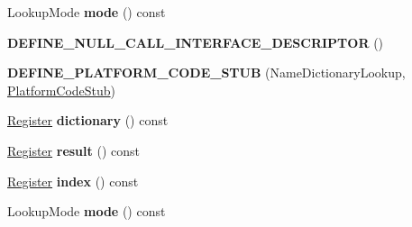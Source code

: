 \begin{DoxyCompactItemize}
\item 
Lookup\+Mode {\bfseries mode} () const \hypertarget{classv8_1_1internal_1_1_name_dictionary_lookup_stub_ae1880a8b261f163f4d11a3d3809252ab}{}\label{classv8_1_1internal_1_1_name_dictionary_lookup_stub_ae1880a8b261f163f4d11a3d3809252ab}

\item 
{\bfseries D\+E\+F\+I\+N\+E\+\_\+\+N\+U\+L\+L\+\_\+\+C\+A\+L\+L\+\_\+\+I\+N\+T\+E\+R\+F\+A\+C\+E\+\_\+\+D\+E\+S\+C\+R\+I\+P\+T\+OR} ()\hypertarget{classv8_1_1internal_1_1_name_dictionary_lookup_stub_a56e72757ba3ab8928220e89075ca6848}{}\label{classv8_1_1internal_1_1_name_dictionary_lookup_stub_a56e72757ba3ab8928220e89075ca6848}

\item 
{\bfseries D\+E\+F\+I\+N\+E\+\_\+\+P\+L\+A\+T\+F\+O\+R\+M\+\_\+\+C\+O\+D\+E\+\_\+\+S\+T\+UB} (Name\+Dictionary\+Lookup, \hyperlink{classv8_1_1internal_1_1_platform_code_stub}{Platform\+Code\+Stub})\hypertarget{classv8_1_1internal_1_1_name_dictionary_lookup_stub_a9b6511fda10d2ab14ce9366da895bb71}{}\label{classv8_1_1internal_1_1_name_dictionary_lookup_stub_a9b6511fda10d2ab14ce9366da895bb71}

\item 
\hyperlink{structv8_1_1internal_1_1_register}{Register} {\bfseries dictionary} () const \hypertarget{classv8_1_1internal_1_1_name_dictionary_lookup_stub_ac861b8263ad2fe6df68e0e9d6fb8b3b7}{}\label{classv8_1_1internal_1_1_name_dictionary_lookup_stub_ac861b8263ad2fe6df68e0e9d6fb8b3b7}

\item 
\hyperlink{structv8_1_1internal_1_1_register}{Register} {\bfseries result} () const \hypertarget{classv8_1_1internal_1_1_name_dictionary_lookup_stub_a2a5e0dc2f0d9b217467de313058274ba}{}\label{classv8_1_1internal_1_1_name_dictionary_lookup_stub_a2a5e0dc2f0d9b217467de313058274ba}

\item 
\hyperlink{structv8_1_1internal_1_1_register}{Register} {\bfseries index} () const \hypertarget{classv8_1_1internal_1_1_name_dictionary_lookup_stub_a09f710557ee64050dd1afb300391839d}{}\label{classv8_1_1internal_1_1_name_dictionary_lookup_stub_a09f710557ee64050dd1afb300391839d}

\item 
Lookup\+Mode {\bfseries mode} () const \hypertarget{classv8_1_1internal_1_1_name_dictionary_lookup_stub_ae1880a8b261f163f4d11a3d3809252ab}{}\label{classv8_1_1internal_1_1_name_dictionary_lookup_stub_ae1880a8b261f163f4d11a3d3809252ab}


\end{DoxyCompactItemize}
